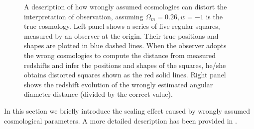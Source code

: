 \documentclass[iop]{emulateapj}
\begin{document}
\begin{figure}
   \caption{\label{fig_xyquan}
   A description of how wrongly assumed cosmologies can distort the interpretation of observation,
   assuming $\Omega_m=0.26,w=-1$ is the true cosmology. 
   Left panel shows a series of five regular squares, measured by an observer at the origin.
   Their true positions and shapes are plotted in blue dashed lines.
   When the observer adopts the wrong cosmologies to compute the distance from measured redshifts and infer the positions and shapes of the squares,
   he/she obtains distorted squares shown as the red solid lines.
   Right panel shows the redshift evolution of the wrongly estimated angular diameter distance (divided by the correct value).
   }
\end{figure}

In this section we briefly introduce the scaling effect caused by wrongly assumed cosmological parameters.
A more detailed description has been provided in \cite{Li2014,Li2015,Li2016}.
\end{document}
